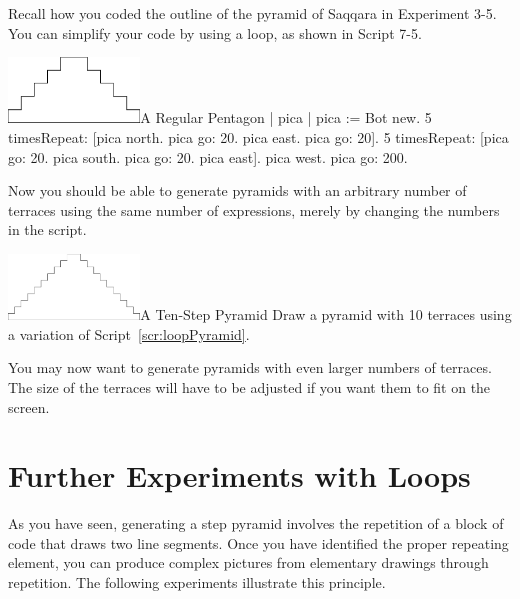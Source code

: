 \documentclass[a4paper,10pt,twoside]{book}
\begin{document}
Recall how you coded the outline of the pyramid of Saqqara in Experiment 3-5. You can simplify 
your code by using a loop, as shown in Script 7-5. 

\begin{exofigwithsize}[0.7]{\includegraphics[width=3.5cm]{loopPyramid}}{A Regular Pentagon}\label{xp:loopPyramid}
	| pica | 
	pica := Bot new. 
	5 timesRepeat: 
		[pica north. 
		pica go: 20. 
		pica east. 
		pica go: 20]. 
	5 timesRepeat: 
		[pica go: 20. 
		pica south. 
		pica go: 20. 
		pica east]. 
	pica west. 
	pica go: 200. 
\end{exofigwithsize}

Now you should be able to generate pyramids with an arbitrary number of terraces using 
the same number of expressions, merely by changing the numbers in the script. 

\begin{exofigwithsize}[0.7]{\includegraphics[width=3.5cm]{loopPyramid10}}{A Ten-Step Pyramid}\label{xp:loopPyramidten}
Draw a pyramid with 10 terraces using a variation of Script~\ref{scr:loopPyramid}. 
\end{exofigwithsize}

You may now want to generate pyramids with even larger numbers of terraces. The size of 
the terraces will have to be adjusted if you want them to fit on the screen. 

\section{Further Experiments with Loops}

As you have seen, generating a step pyramid involves the repetition of a block of code that 
draws two line segments. Once you have identified the proper repeating element, you can 
produce complex pictures from elementary drawings through repetition. The following 
experiments illustrate this principle. 



\ifx\wholebook\relax\else
    
\end{document}
